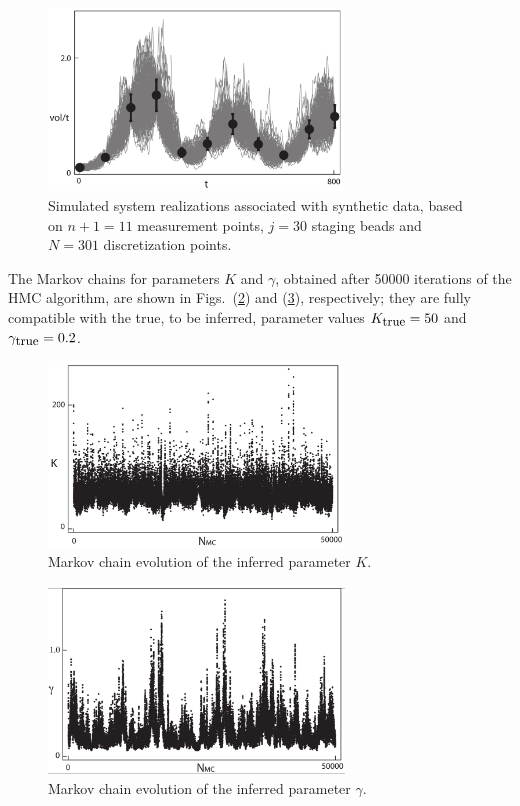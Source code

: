 \documentclass[11pt]{article}
\theoremstyle{definition}
\begin{document}
%
\begin{figure}[htb!]
    \centering
    \includegraphics[width=0.7\textwidth]{Fig3.pdf}
    \caption{Simulated system realizations associated with synthetic data, based on $n+1 = 11$ measurement points, $j=30$ staging beads and  $N=301$ discretization points. 
}
    \label{fig:spaghetti}
\end{figure}
The Markov chains for parameters $K$ and $\gamma$, obtained after 50000 iterations of the HMC algorithm, are shown in Figs.~(\ref{fig:chainK}) and (\ref{fig:chainG}), respectively; they are fully compatible with the true, to be inferred, parameter values $K_{\mbox{\small true}} = 50$ and $\gamma_{\mbox{\small true}}=0.2$.



\begin{figure}[htb!]
    \centering
    \includegraphics[width=0.7\textwidth]{Fig4.pdf}
    \caption{Markov chain evolution of the inferred parameter $K$.}
    \label{fig:chainK}
\end{figure}
%
\begin{figure}[htb!]
    \centering
    \includegraphics[width=0.7\textwidth]{Fig5.pdf}
    \caption{Markov chain evolution of the inferred parameter $\gamma$.}
    \label{fig:chainG}
\end{figure}
\end{document}
